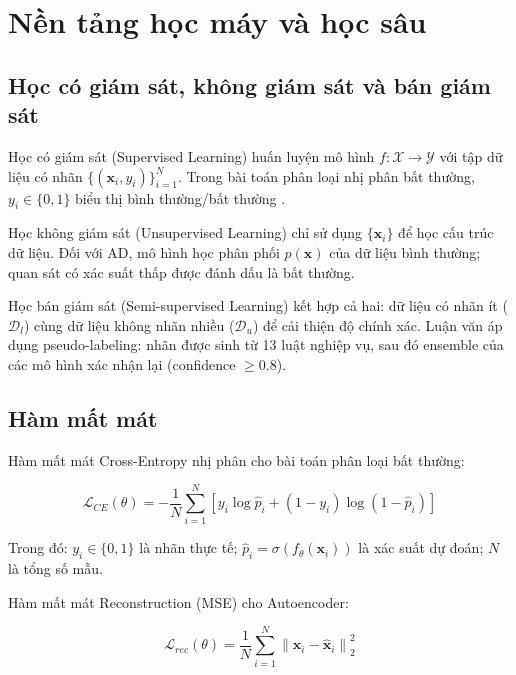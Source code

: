 
\section{Nền tảng học máy và học sâu}

\subsection{Học có giám sát, không giám sát và bán giám sát}

Học có giám sát (Supervised Learning) huấn luyện mô hình $f: \mathcal{X} \to \mathcal{Y}$ với tập dữ liệu có nhãn $\{(\mathbf{x}_i, y_i)\}_{i=1}^{N}$. Trong bài toán phân loại nhị phân bất thường, $y_i \in \{0, 1\}$ biểu thị bình thường/bất thường \cite{bishop2006pattern}.

Học không giám sát (Unsupervised Learning) chỉ sử dụng $\{\mathbf{x}_i\}$ để học cấu trúc dữ liệu. Đối với AD, mô hình học phân phối $p(\mathbf{x})$ của dữ liệu bình thường; quan sát có xác suất thấp được đánh dấu là bất thường.

Học bán giám sát (Semi-supervised Learning) kết hợp cả hai: dữ liệu có nhãn ít ($\mathcal{D}_l$) cùng dữ liệu không nhãn nhiều ($\mathcal{D}_u$) để cải thiện độ chính xác. Luận văn áp dụng pseudo-labeling: nhãn được sinh từ 13 luật nghiệp vụ, sau đó ensemble của các mô hình xác nhận lại (confidence $\geq 0.8$).

\subsection{Hàm mất mát}

Hàm mất mát Cross-Entropy nhị phân cho bài toán phân loại bất thường:

\begin{equation}
  \mathcal{L}_{CE}(\theta) = -\frac{1}{N} \sum_{i=1}^{N}
    \left[ y_i \log \hat{p}_i + (1-y_i) \log(1-\hat{p}_i) \right]
  \label{eq:cross_entropy}
\end{equation}

Trong đó: $y_i \in \{0,1\}$ là nhãn thực tế; $\hat{p}_i = \sigma(f_\theta(\mathbf{x}_i))$ là xác suất dự đoán; $N$ là tổng số mẫu.

Hàm mất mát Reconstruction (MSE) cho Autoencoder:

\begin{equation}
  \mathcal{L}_{rec}(\theta) = \frac{1}{N} \sum_{i=1}^{N}
    \left\| \mathbf{x}_i - \hat{\mathbf{x}}_i \right\|_2^2
  \label{eq:reconstruction}
\end{equation}

